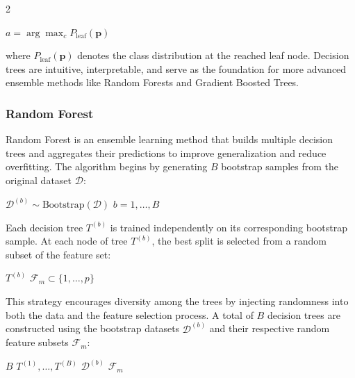 \documentclass[bst/sn-nature]{sn-jnl}
\begin{document}
\begin{multicols}{2}
\begin{center}
    $a = \arg\max_c P_{\text{leaf}}(\mathbf{p})$ \vspace{0.3cm}
\end{center}

where $P_{\text{leaf}}(\mathbf{p})$ denotes the class distribution at the reached leaf node. Decision trees are intuitive, interpretable, and serve as the foundation for more advanced ensemble methods like Random Forests and Gradient Boosted Trees.

\subsubsection{Random Forest\cite{rf}}

\quad Random Forest is an ensemble learning method that builds multiple decision trees and aggregates their predictions to improve generalization and reduce overfitting. The algorithm begins by generating $B$ bootstrap samples from the original dataset $\mathcal{D}$: \\ 

\begin{center}
     $\mathcal{D}^{(b)} \sim \text{Bootstrap}(\mathcal{D})$  $b = 1, \dots,B$  \vspace{0.3cm}
\end{center}

Each decision tree $T^{(b)}$ is trained independently on its corresponding bootstrap sample. At each node of tree $T^{(b)}$, the best split is selected from a random subset of the feature set: \\ 

\begin{center}
     $T^{(b)}$  $\mathcal{F}_m \subset \{1, \dots, p\}$ \vspace{0.3cm}
\end{center}

This strategy encourages diversity among the trees by injecting randomness into both the data and the feature selection process. A total of $B$ decision trees are constructed using the bootstrap datasets $\mathcal{D}^{(b)}$ and their respective random feature subsets $\mathcal{F}_m$: \\

\begin{center}
     $B$  $T^{(1)}, \dots, T^{(B)}$  $\mathcal{D}^{(b)}$  $\mathcal{F}_m$ \vspace{0.3cm}
\end{center}


\end{multicols}
\end{document}
